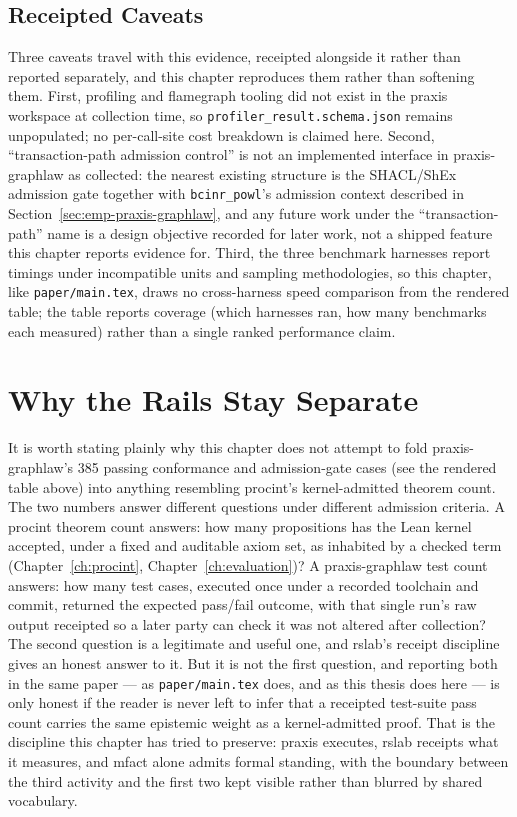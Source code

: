 

\subsection{Receipted Caveats}
\label{sec:emp-caveats}

Three caveats travel with this evidence, receipted alongside it rather
than reported separately, and this chapter reproduces them rather than
softening them. First, profiling and flamegraph tooling did not exist in
the praxis workspace at collection time, so
\texttt{profiler\_result.schema.json} remains unpopulated; no
per-call-site cost breakdown is claimed here. Second,
``transaction-path admission control'' is not an implemented interface
in praxis-graphlaw as collected: the nearest existing structure is the
SHACL/ShEx admission gate together with \texttt{bcinr\_powl}'s admission
context described in Section~\ref{sec:emp-praxis-graphlaw}, and any
future work under the ``transaction-path'' name is a design objective
recorded for later work, not a shipped feature this chapter reports
evidence for. Third, the three benchmark harnesses report timings under
incompatible units and sampling methodologies, so this chapter, like
\texttt{paper/main.tex}, draws no cross-harness speed comparison from the
rendered table; the table reports coverage (which harnesses ran, how
many benchmarks each measured) rather than a single ranked performance
claim.

\section{Why the Rails Stay Separate}
\label{sec:emp-why-separate}

It is worth stating plainly why this chapter does not attempt to fold
praxis-graphlaw's 385 passing conformance and admission-gate cases (see
the rendered table above) into anything resembling \textsf{procint}'s
kernel-admitted theorem count. The two numbers answer different
questions under different admission criteria. A \textsf{procint} theorem
count answers: how many propositions has the Lean kernel accepted, under
a fixed and auditable axiom set, as inhabited by a checked term
(Chapter~\ref{ch:procint}, Chapter~\ref{ch:evaluation})? A
praxis-graphlaw test count answers: how many test cases, executed once
under a recorded toolchain and commit, returned the expected pass/fail
outcome, with that single run's raw output receipted so a later party
can check it was not altered after collection? The second question is a
legitimate and useful one, and rslab's receipt discipline gives an
honest answer to it. But it is not the first question, and reporting
both in the same paper --- as \texttt{paper/main.tex} does, and as this
thesis does here --- is only honest if the reader is never left to infer
that a receipted test-suite pass count carries the same epistemic weight
as a kernel-admitted proof. That is the discipline this chapter has tried
to preserve: praxis executes, rslab receipts what it measures, and
\textsf{mfact} alone admits formal standing, with the boundary between
the third activity and the first two kept visible rather than blurred by
shared vocabulary.

